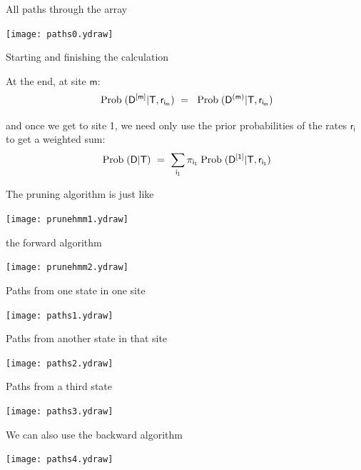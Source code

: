 \documentclass[bluish,slideColor,colorBG,pdf]{prosper}
\def\prob{{\rm \;Prob\;}}
\begin{document}
\begin{slide}[Replace]{All paths through the array}

\centerline{\texttt{[image: paths0.ydraw]}}

\end{slide}

\begin{slide}[Replace]{Starting and finishing the calculation}

At the end, at site $\mathsf{m}$:
\[
\mathsf{\prob(D^{[m]} | T, r_{i_m})\ =\ \prob(D^{(m)} | T, r_{i_m})}
\]

and once we get to site 1, we need only use the prior probabilities of
the rates $\mathsf{r_i}$ to get a weighted sum:
\[
\mathsf{\prob(D | T) \ =\  \sum\limits_{i_1} \pi_{i_1} \prob(D^{[1]} | T, r_{i_1})}
\]

\end{slide}

\begin{slide}[Replace]{The pruning algorithm is just like}

\centerline{\texttt{[image: prunehmm1.ydraw]}}

\end{slide}

\begin{slide}[Replace]{the forward algorithm}

\centerline{\texttt{[image: prunehmm2.ydraw]}}

\end{slide}

\begin{slide}[Replace]{Paths from one state in one site}

\centerline{\texttt{[image: paths1.ydraw]}}

\end{slide}

\begin{slide}[Replace]{Paths from another state in that site}

\centerline{\texttt{[image: paths2.ydraw]}}

\end{slide}

\begin{slide}[Replace]{Paths from a third state}

\centerline{\texttt{[image: paths3.ydraw]}}

\end{slide}

\begin{slide}[Replace]{We can also use the backward algorithm}

\centerline{\texttt{[image: paths4.ydraw]}}

\end{slide}
\end{document}
